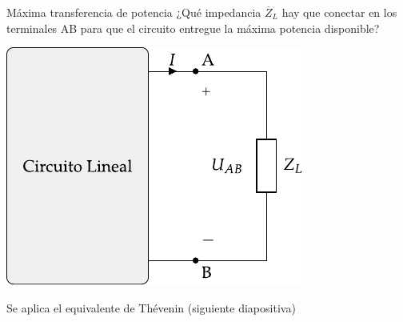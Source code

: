 \documentclass[aspectratio=169, usenames,svgnames,dvipsnames]{beamer}
\begin{document}
\begin{frame}{Máxima transferencia de potencia}
    \vspace{2mm}
    ¿Qué impedancia \(\overline{Z}_L\) hay que conectar en los terminales AB para que el circuito entregue la \alert{máxima potencia disponible}?
    
    \begin{center}
        \includegraphics[height=0.55\textheight]{../figs/EquivalenteThevenin.pdf}
    \end{center}
    
    Se aplica el \alert{equivalente de Thévenin} (siguiente diapositiva)
\end{frame}

\end{document}
